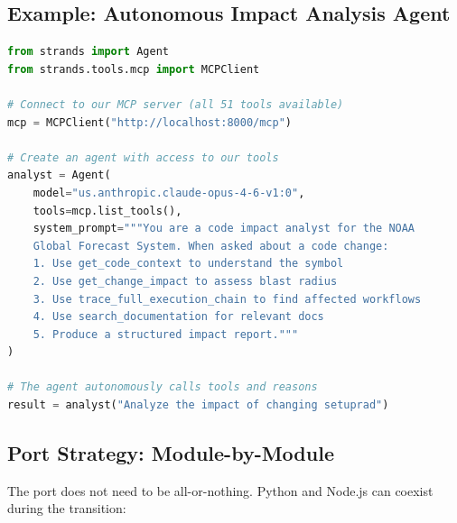 \documentclass[11pt,letterpaper]{article}
\begin{document}
\subsection{Example: Autonomous Impact Analysis Agent}

\begin{lstlisting}[language=Python,caption={Strands agent that autonomously analyzes code change impact.}]
from strands import Agent
from strands.tools.mcp import MCPClient

# Connect to our MCP server (all 51 tools available)
mcp = MCPClient("http://localhost:8000/mcp")

# Create an agent with access to our tools
analyst = Agent(
    model="us.anthropic.claude-opus-4-6-v1:0",
    tools=mcp.list_tools(),
    system_prompt="""You are a code impact analyst for the NOAA
    Global Forecast System. When asked about a code change:
    1. Use get_code_context to understand the symbol
    2. Use get_change_impact to assess blast radius
    3. Use trace_full_execution_chain to find affected workflows
    4. Use search_documentation for relevant docs
    5. Produce a structured impact report."""
)

# The agent autonomously calls tools and reasons
result = analyst("Analyze the impact of changing setuprad")
\end{lstlisting}

\subsection{Port Strategy: Module-by-Module}

The port does not need to be all-or-nothing. Python and Node.js can
coexist during the transition:
\end{document}
